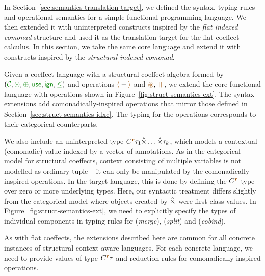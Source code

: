 In Section~\ref{sec:semantics-translation-target}, we defined the syntax, typing rules and
operational semantics for a simple functional programming language. We then extended it with
uninterpreted constructs inspired by the \emph{flat indexed comonad} structure and used it as the
translation target for the flat coeffect calculus. In this section, we take the same core language
and extend it with constructs inspired by the \emph{structural indexed comonad}.

Given a coeffect language with a structural coeffect algebra formed by
$(\C, \cseq, \cpar, \cunit, \czero, \cleq)$ and operations $\alift{-}$ and $\aseq, \atimes$, we
extend the core functional language with operations shown in Figure~\ref{fig:struct-semantics-ext}.
The syntax extensions add comonadically-inspired operations that mirror those defined in
Section~\ref{sec:struct-semantics-idxc}. The typing for the operations corresponds to their
categorical counterparts.

We also include an uninterpreted type $\ctyp{\aclrd{\textbf{r}}}{\tau_1\xtimes\ldots\xtimes\tau_k}$,
which models a contextual (comonadic) value indexed by a vector of annotations. As in the
categorical model for structural coeffects, context consisting of multiple variables is not modelled
as ordinary tuple -- it can only be manipulated by the comonadically-inspired operations.
In the target language, this is done by defining the $\ctyp{\aclrd{\textbf{r}}}{}$ type over
zero or more underlying types. Here, our syntactic treatment differs slightly from the categorical
model where objects created by $\hat{\times}$ were first-class values. In Figure~\ref{fig:struct-semantics-ext},
we need to explicitly specify the types of individual components in typing rules for
(\emph{merge}), (\emph{split}) and (\emph{cobind}).

As with flat coeffects, the extensions described here are common for all concrete instances of
structural context-aware languages. For each concrete language, we need to provide values of type
$\ctyp{\aclrd{\textbf{r}}}{\tau}$ and reduction rules for comonadically-inspired operations.


